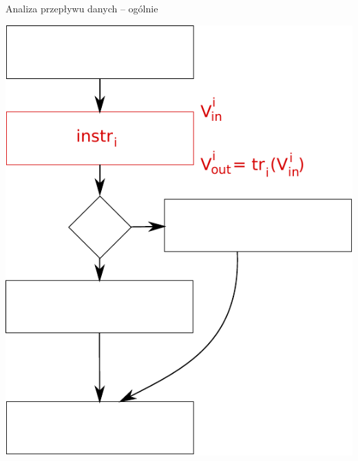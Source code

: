 \documentclass[handout]{beamer}
\begin{document}
\begin{frame}{Analiza przepływu danych -- ogólnie}
\begin{center}
  \includegraphics[scale=0.55]{img/dataflow-1.pdf}  
\end{center}
\end{frame}
\end{document}
